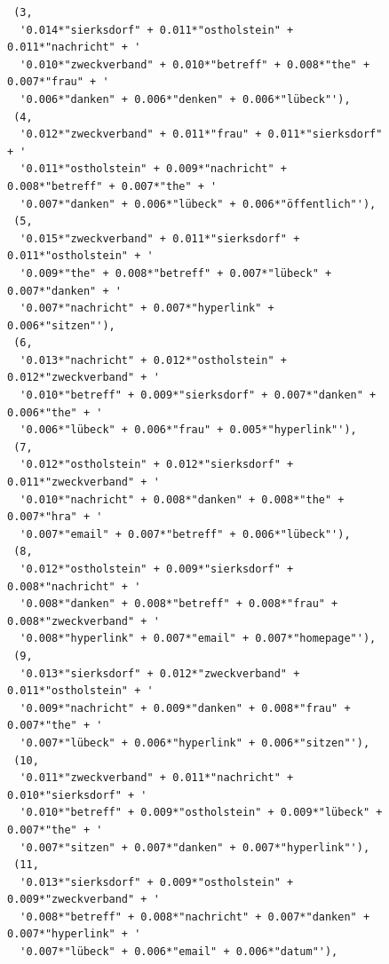 \documentclass[german,version-2020-11]{uzl-thesis}
\begin{document}
  \begin{figure}[h]
  \begin{lstlisting}
 (3,
  '0.014*"sierksdorf" + 0.011*"ostholstein" + 0.011*"nachricht" + '
  '0.010*"zweckverband" + 0.010*"betreff" + 0.008*"the" + 0.007*"frau" + '
  '0.006*"danken" + 0.006*"denken" + 0.006*"lübeck"'),
 (4,
  '0.012*"zweckverband" + 0.011*"frau" + 0.011*"sierksdorf" + '
  '0.011*"ostholstein" + 0.009*"nachricht" + 0.008*"betreff" + 0.007*"the" + '
  '0.007*"danken" + 0.006*"lübeck" + 0.006*"öffentlich"'),
 (5,
  '0.015*"zweckverband" + 0.011*"sierksdorf" + 0.011*"ostholstein" + '
  '0.009*"the" + 0.008*"betreff" + 0.007*"lübeck" + 0.007*"danken" + '
  '0.007*"nachricht" + 0.007*"hyperlink" + 0.006*"sitzen"'),
 (6,
  '0.013*"nachricht" + 0.012*"ostholstein" + 0.012*"zweckverband" + '
  '0.010*"betreff" + 0.009*"sierksdorf" + 0.007*"danken" + 0.006*"the" + '
  '0.006*"lübeck" + 0.006*"frau" + 0.005*"hyperlink"'),
 (7,
  '0.012*"ostholstein" + 0.012*"sierksdorf" + 0.011*"zweckverband" + '
  '0.010*"nachricht" + 0.008*"danken" + 0.008*"the" + 0.007*"hra" + '
  '0.007*"email" + 0.007*"betreff" + 0.006*"lübeck"'),
 (8,
  '0.012*"ostholstein" + 0.009*"sierksdorf" + 0.008*"nachricht" + '
  '0.008*"danken" + 0.008*"betreff" + 0.008*"frau" + 0.008*"zweckverband" + '
  '0.008*"hyperlink" + 0.007*"email" + 0.007*"homepage"'),
 (9,
  '0.013*"sierksdorf" + 0.012*"zweckverband" + 0.011*"ostholstein" + '
  '0.009*"nachricht" + 0.009*"danken" + 0.008*"frau" + 0.007*"the" + '
  '0.007*"lübeck" + 0.006*"hyperlink" + 0.006*"sitzen"'),
 (10,
  '0.011*"zweckverband" + 0.011*"nachricht" + 0.010*"sierksdorf" + '
  '0.010*"betreff" + 0.009*"ostholstein" + 0.009*"lübeck" + 0.007*"the" + '
  '0.007*"sitzen" + 0.007*"danken" + 0.007*"hyperlink"'),
 (11,
  '0.013*"sierksdorf" + 0.009*"ostholstein" + 0.009*"zweckverband" + '
  '0.008*"betreff" + 0.008*"nachricht" + 0.007*"danken" + 0.007*"hyperlink" + '
  '0.007*"lübeck" + 0.006*"email" + 0.006*"datum"'),
  \end{lstlisting}
  \end{figure}
  \newpage
\end{document}
